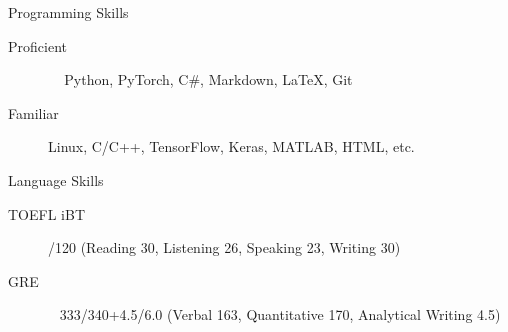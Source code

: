 \documentclass{resume} %
\begin{document}
\vspace{-0.2cm}

\begin{rSection}{Programming Skills}

\begin{description}
    \item[Proficient] \quad\,\,\,\,\, Python, PyTorch, C\#, Markdown, LaTeX, Git
    \item[Familiar] \quad\quad\quad Linux, C/C++, TensorFlow, Keras, MATLAB, HTML, etc.
    \newline
\end{description}

\end{rSection}

\vspace{-0.2cm}

\begin{rSection}{Language Skills}

\begin{description}
    \item[TOEFL iBT] /120 (Reading 30, Listening 26, Speaking 23, Writing 30)
    \item[GRE] \quad\quad\quad\quad\,\,\, 333/340+4.5/6.0 (Verbal 163, Quantitative 170, Analytical Writing 4.5)
\end{description}

\end{rSection}
\end{document}

